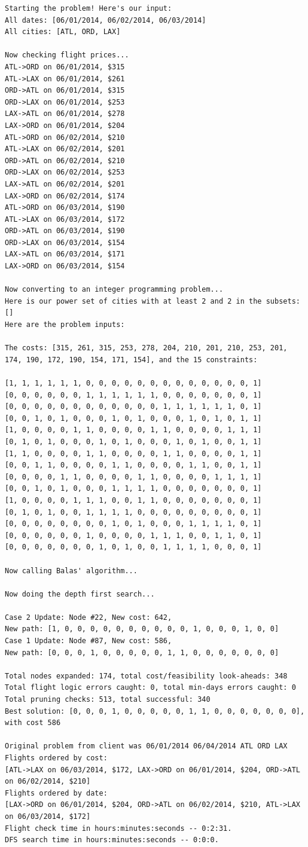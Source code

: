 \documentclass{article}
\begin{document}
\footnotesize
\begin{verbatim}
Starting the problem! Here's our input:
All dates: [06/01/2014, 06/02/2014, 06/03/2014]
All cities: [ATL, ORD, LAX]

Now checking flight prices...
ATL->ORD on 06/01/2014, $315
ATL->LAX on 06/01/2014, $261
ORD->ATL on 06/01/2014, $315
ORD->LAX on 06/01/2014, $253
LAX->ATL on 06/01/2014, $278
LAX->ORD on 06/01/2014, $204
ATL->ORD on 06/02/2014, $210
ATL->LAX on 06/02/2014, $201
ORD->ATL on 06/02/2014, $210
ORD->LAX on 06/02/2014, $253
LAX->ATL on 06/02/2014, $201
LAX->ORD on 06/02/2014, $174
ATL->ORD on 06/03/2014, $190
ATL->LAX on 06/03/2014, $172
ORD->ATL on 06/03/2014, $190
ORD->LAX on 06/03/2014, $154
LAX->ATL on 06/03/2014, $171
LAX->ORD on 06/03/2014, $154

Now converting to an integer programming problem...
Here is our power set of cities with at least 2 and 2 in the subsets: []
Here are the problem inputs:

The costs: [315, 261, 315, 253, 278, 204, 210, 201, 210, 253, 201,
174, 190, 172, 190, 154, 171, 154], and the 15 constraints:

[1, 1, 1, 1, 1, 1, 0, 0, 0, 0, 0, 0, 0, 0, 0, 0, 0, 0, 0, 1]
[0, 0, 0, 0, 0, 0, 1, 1, 1, 1, 1, 1, 0, 0, 0, 0, 0, 0, 0, 1]
[0, 0, 0, 0, 0, 0, 0, 0, 0, 0, 0, 0, 1, 1, 1, 1, 1, 1, 0, 1]
[0, 0, 1, 0, 1, 0, 0, 0, 1, 0, 1, 0, 0, 0, 1, 0, 1, 0, 1, 1]
[1, 0, 0, 0, 0, 1, 1, 0, 0, 0, 0, 1, 1, 0, 0, 0, 0, 1, 1, 1]
[0, 1, 0, 1, 0, 0, 0, 1, 0, 1, 0, 0, 0, 1, 0, 1, 0, 0, 1, 1]
[1, 1, 0, 0, 0, 0, 1, 1, 0, 0, 0, 0, 1, 1, 0, 0, 0, 0, 1, 1]
[0, 0, 1, 1, 0, 0, 0, 0, 1, 1, 0, 0, 0, 0, 1, 1, 0, 0, 1, 1]
[0, 0, 0, 0, 1, 1, 0, 0, 0, 0, 1, 1, 0, 0, 0, 0, 1, 1, 1, 1]
[0, 0, 1, 0, 1, 0, 0, 0, 1, 1, 1, 1, 0, 0, 0, 0, 0, 0, 0, 1]
[1, 0, 0, 0, 0, 1, 1, 1, 0, 0, 1, 1, 0, 0, 0, 0, 0, 0, 0, 1]
[0, 1, 0, 1, 0, 0, 1, 1, 1, 1, 0, 0, 0, 0, 0, 0, 0, 0, 0, 1]
[0, 0, 0, 0, 0, 0, 0, 0, 1, 0, 1, 0, 0, 0, 1, 1, 1, 1, 0, 1]
[0, 0, 0, 0, 0, 0, 1, 0, 0, 0, 0, 1, 1, 1, 0, 0, 1, 1, 0, 1]
[0, 0, 0, 0, 0, 0, 0, 1, 0, 1, 0, 0, 1, 1, 1, 1, 0, 0, 0, 1]

Now calling Balas' algorithm...

Now doing the depth first search...

Case 2 Update: Node #22, New cost: 642, 
New path: [1, 0, 0, 0, 0, 0, 0, 0, 0, 0, 0, 1, 0, 0, 0, 1, 0, 0]
Case 1 Update: Node #87, New cost: 586, 
New path: [0, 0, 0, 1, 0, 0, 0, 0, 0, 1, 1, 0, 0, 0, 0, 0, 0, 0]

Total nodes expanded: 174, total cost/feasibility look-aheads: 348
Total flight logic errors caught: 0, total min-days errors caught: 0
Total pruning checks: 513, total successful: 340
Best solution: [0, 0, 0, 1, 0, 0, 0, 0, 0, 1, 1, 0, 0, 0, 0, 0, 0, 0], with cost 586

Original problem from client was 06/01/2014 06/04/2014 ATL ORD LAX
Flights ordered by cost:
[ATL->LAX on 06/03/2014, $172, LAX->ORD on 06/01/2014, $204, ORD->ATL on 06/02/2014, $210]
Flights ordered by date:
[LAX->ORD on 06/01/2014, $204, ORD->ATL on 06/02/2014, $210, ATL->LAX on 06/03/2014, $172]
Flight check time in hours:minutes:seconds -- 0:2:31.
DFS search time in hours:minutes:seconds -- 0:0:0.
\end{verbatim}
\normalsize
\end{document}
